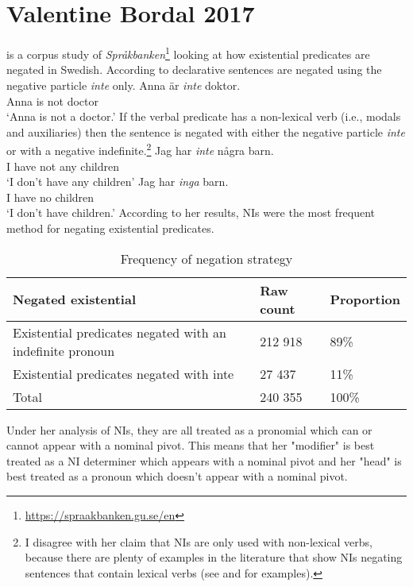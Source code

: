 \documentclass[12pt, letterpaper]{article}
\begin{document}
\section{Valentine Bordal 2017} \label{sec:VB}

\ea \citet{valentinebordalNegationExistentialPredications2017} is a corpus study of \textit{Språkbanken}\footnote{\url{https://spraakbanken.gu.se/en}} looking at how existential predicates are negated in Swedish.
\ex According to \citeauthor{valentinebordalNegationExistentialPredications2017} declarative sentences are negated using the negative particle \textit{inte} only. 
	\ea
	\gll Anna är \textit{inte} doktor.\\
	Anna is not doctor\\
	\glt `Anna is not a doctor.'
	\z 
\ex If the verbal predicate has a non-lexical verb (i.e., modals and auxiliaries) then the sentence is negated with either the negative particle \textit{inte} or with a negative indefinite.\footnote{I disagree with her claim that NIs are only used with non-lexical verbs, because there are plenty of examples in the literature that show NIs negating sentences that contain lexical verbs (see \cite{engelsScandinavianNegativeIndefinites2012} and \cite{christensenInterfacesNegationSyntax2005} for examples).} 
	\ea
	\gll Jag har \textit{inte} några barn.\\
	I have not any children\\
	\glt `I don't have any children'
	\ex 
	\gll Jag har \textit{inga} barn.\\
	I have no children\\
	\glt `I don't have children.'
	\z 
\ex According to her results, NIs were the most frequent method for negating existential predicates. 
	
	\begin{table}[!h]
	\centering
	\caption{Frequency of negation strategy}
	\begin{tabular}{lll}
	\hline
	Negated existential & Raw count & Proportion\\
	\hline
	Existential predicates negated with an indefinite pronoun & 212 918 & 89\% \\
	Existential predicates negated with inte & 27 437 & 11\% \\
	\hline
	Total & 240 355 & 100\%  \\
	\hline
	\end{tabular}
	\end{table}

\ex Under her analysis of NIs, they are all treated as a pronomial which can or cannot appear with a nominal pivot.
	\ea This means that her "modifier" is best treated as a NI determiner which appears with a nominal pivot and her "head" is best treated as a pronoun which doesn't appear with a nominal pivot.
	\z 
\end{document}

